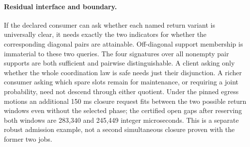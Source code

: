 \documentclass{article}
\begin{document}
\paragraph{Residual interface and boundary.}
If the declared consumer can ask whether each named return variant
is universally clear, it needs exactly the two indicators for
whether the corresponding diagonal pairs are attainable.
Off-diagonal support membership is immaterial to these two queries.
The four signatures over all nonempty pair supports are both
sufficient and pairwise distinguishable. A client asking only
whether the whole coordination law is safe needs just their
disjunction. A richer consumer asking which spare slots remain
for maintenance, or requiring a joint probability, need not descend
through either quotient. Under the pinned egress motions an
additional 150 ms closure request fits between the two possible
return windows even without the selected phase; the certified open
gaps after reserving both windows are 283,340 and 245,449 integer
microseconds. This is a separate robust admission example, not a
second simultaneous closure proven with the former two jobs.
\end{document}
